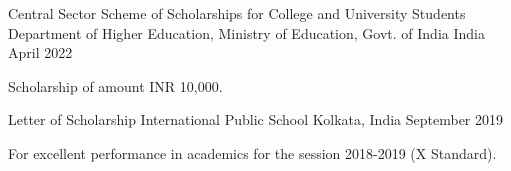 
\begin{cventries}

    \cventry
      {Central Sector Scheme of Scholarships for College and University Students} %
      {Department of Higher Education, Ministry of Education, Govt. of India} %
      {India} %
      {April 2022} %
      {
        \begin{cvitems} %
          \item{Scholarship of amount INR 10,000.}
        \end{cvitems}
      }
  
      \cventry
      {Letter of Scholarship} %
      {International Public School} %
      {Kolkata, India} %
      {September 2019} %
      {
        \begin{cvitems} %
          \item{For excellent performance in academics for the session 2018-2019 (X Standard).}
        \end{cvitems}
      }

  \end{cventries}
  
